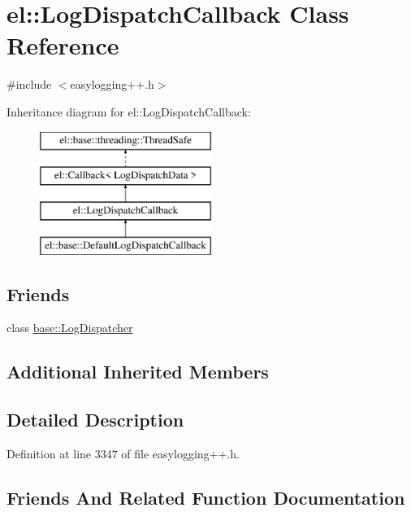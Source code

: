 \hypertarget{classel_1_1_log_dispatch_callback}{}\section{el\+:\+:Log\+Dispatch\+Callback Class Reference}
\label{classel_1_1_log_dispatch_callback}


{\ttfamily \#include $<$easylogging++.\+h$>$}

Inheritance diagram for el\+:\+:Log\+Dispatch\+Callback\+:\begin{figure}[H]
\begin{center}
\leavevmode
\includegraphics[height=4.000000cm]{classel_1_1_log_dispatch_callback}
\end{center}
\end{figure}
\subsection*{Friends}
\begin{DoxyCompactItemize}
\item 
class \hyperlink{classel_1_1_log_dispatch_callback_a84d22f9ad5b796e49ff5f15a8c32773d}{base\+::\+Log\+Dispatcher}
\end{DoxyCompactItemize}
\subsection*{Additional Inherited Members}


\subsection{Detailed Description}


Definition at line 3347 of file easylogging++.\+h.



\subsection{Friends And Related Function Documentation}
\hypertarget{classel_1_1_log_dispatch_callback_a84d22f9ad5b796e49ff5f15a8c32773d}{}
